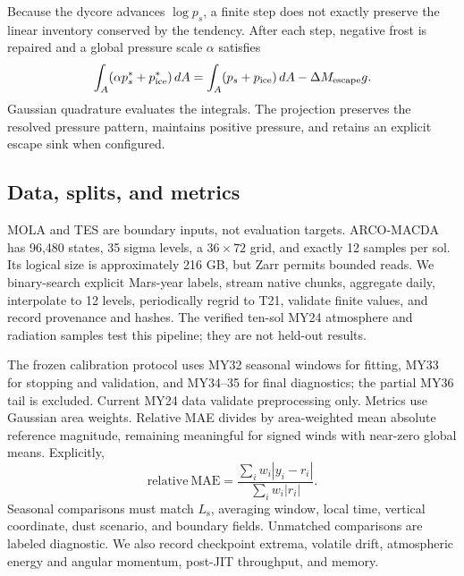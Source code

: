 \documentclass{article}
\newcommand{\Ls}{L_\mathrm{s}}
\begin{document}
Because the dycore advances \(\log p_s\), a finite step does not exactly preserve
the linear inventory conserved by the tendency. After each step, negative frost
is repaired and a global pressure scale \(\alpha\) satisfies
\begin{equation}
\int_A(\alpha p_s^*+p_{\rm ice}^*)\,dA
=\int_A(p_s+p_{\rm ice})\,dA-\Delta M_{\rm escape}g.
\end{equation}
Gaussian quadrature evaluates the integrals. The projection preserves the
resolved pressure pattern, maintains positive pressure, and retains an explicit
escape sink when configured.

\subsection{Data, splits, and metrics}
MOLA and TES are boundary inputs, not evaluation targets. ARCO-MACDA has 96,480
states, 35 sigma levels, a \(36\times72\) grid, and exactly 12 samples per sol.
Its logical size is approximately 216 GB, but Zarr permits bounded reads. We
binary-search explicit Mars-year labels, stream native chunks, aggregate daily,
interpolate to 12 levels, periodically regrid to T21, validate finite values,
and record provenance and hashes. The verified ten-sol MY24 atmosphere and
radiation samples test this pipeline; they are not held-out results.

The frozen calibration protocol uses MY32 seasonal windows for fitting, MY33
for stopping and validation, and MY34--35 for final diagnostics; the partial
MY36 tail is excluded. Current MY24 data validate preprocessing only. Metrics use Gaussian
area weights. Relative MAE divides by area-weighted mean absolute reference
magnitude, remaining meaningful for signed winds with near-zero global means.
Explicitly,
\begin{equation}
\mathrm{relative\ MAE}=\frac{\sum_iw_i|y_i-r_i|}{\sum_iw_i|r_i|}.
\end{equation}
Seasonal comparisons must match \(\Ls\), averaging window, local time, vertical
coordinate, dust scenario, and boundary fields. Unmatched comparisons are
labeled diagnostic. We also record checkpoint extrema, volatile drift,
atmospheric energy and angular momentum, post-JIT throughput, and memory.
\end{document}
